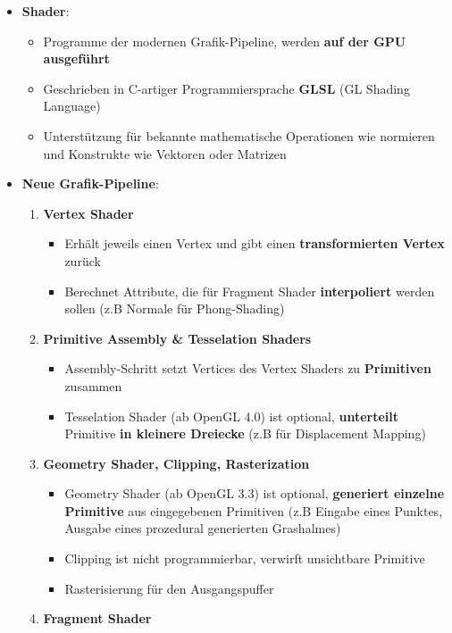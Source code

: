 \documentclass[10pt,a4paper]{article}
\begin{document}
\begin{itemize}
\begin{itemize}
		\end{itemize}
		\item \textbf{Shader}:
		\begin{itemize}
			\item Programme der modernen Grafik-Pipeline, werden \textbf{auf der GPU ausgeführt}
			\item Geschrieben in C-artiger Programmiersprache \textbf{GLSL} (GL Shading Language)
			\item Unterstützung für bekannte mathematische Operationen wie normieren und Konstrukte wie Vektoren oder Matrizen
		\end{itemize}
		\newpage
		\item \textbf{Neue Grafik-Pipeline}:
		\begin{enumerate}
			\item \textbf{Vertex Shader}
			\begin{itemize}
				\item Erhält jeweils einen Vertex und gibt einen \textbf{transformierten Vertex} zurück
				\item Berechnet Attribute, die für Fragment Shader \textbf{interpoliert} werden sollen (z.B Normale für Phong-Shading)
			\end{itemize}
			\item \textbf{Primitive Assembly \& Tesselation Shaders}
			\begin{itemize}
				\item Assembly-Schritt setzt Vertices des Vertex Shaders zu \textbf{Primitiven} zusammen
				\item Tesselation Shader (ab OpenGL 4.0) ist optional, \textbf{unterteilt} Primitive \textbf{in kleinere Dreiecke} (z.B für Displacement Mapping)
			\end{itemize}
			\item \textbf{Geometry Shader, Clipping, Rasterization}
			\begin{itemize}
				\item Geometry Shader (ab OpenGL 3.3) ist optional, \textbf{generiert einzelne Primitive} aus eingegebenen Primitiven (z.B Eingabe eines Punktes, Ausgabe eines prozedural generierten Grashalmes)
				\item Clipping ist nicht programmierbar, verwirft unsichtbare Primitive
				\item Rasterisierung für den Ausgangspuffer
			\end{itemize}
			\item \textbf{Fragment Shader}
			\begin{itemize}

\end{itemize}
\end{enumerate}
\end{itemize}
\end{document}
